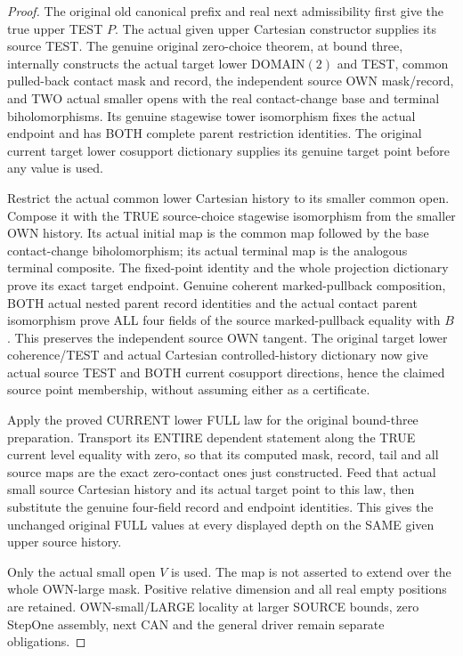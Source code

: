 \begin{proof}
The original old canonical prefix and real next admissibility first give
the true upper TEST $P$. The actual given upper Cartesian constructor
supplies its source TEST. The genuine original zero-choice theorem,
at bound three, internally constructs the actual target lower DOMAIN$(2)$
and TEST, common pulled-back contact mask and record, the independent
source OWN mask/record, and TWO actual smaller opens with the real
contact-change base and terminal biholomorphisms. Its genuine stagewise
tower isomorphism fixes the actual endpoint and has BOTH complete parent
restriction identities. The original current target lower cosupport
dictionary supplies its genuine target point before any value is used.

Restrict the actual common lower Cartesian history to its smaller common
open. Compose it with the TRUE source-choice stagewise isomorphism from
the smaller OWN history. Its actual initial map is the common map
followed by the base contact-change biholomorphism; its actual terminal
map is the analogous terminal composite. The fixed-point identity and
the whole projection dictionary prove its exact target endpoint. Genuine
coherent marked-pullback composition, BOTH actual nested parent record
identities and the actual contact parent isomorphism prove ALL four fields
of the source marked-pullback equality with $B$. This preserves the
independent source OWN tangent. The original target lower coherence/TEST
and actual Cartesian controlled-history dictionary now give actual source
TEST and BOTH current cosupport directions, hence the claimed source
point membership, without assuming either as a certificate.

Apply the proved CURRENT lower FULL law for the original bound-three
preparation. Transport its ENTIRE dependent statement along the TRUE
current level equality with zero, so that its computed mask, record,
tail and all source maps are the exact zero-contact ones just constructed.
Feed that actual small source Cartesian history and its actual target
point to this law, then substitute the genuine four-field record and
endpoint identities. This gives the unchanged original FULL values at
every displayed depth on the SAME given upper source history.

Only the actual small open $V$ is used. The map is not asserted to extend
over the whole OWN-large mask. Positive relative dimension and all real
empty positions are retained. OWN-small/LARGE locality at larger SOURCE
bounds, zero StepOne assembly, next CAN and the general driver remain
separate obligations.
\end{proof}
